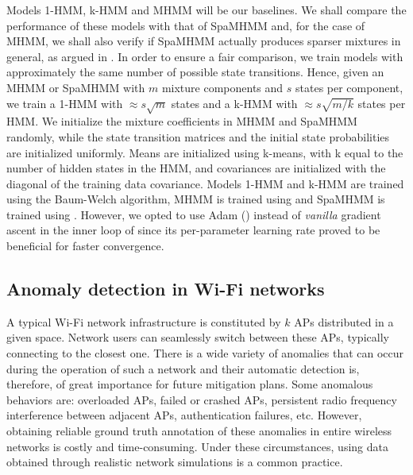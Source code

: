 Models 1-HMM, k-HMM and MHMM will be our baselines. We shall compare the performance of these models with that of SpaMHMM and, for the case of MHMM, we shall also verify if SpaMHMM actually produces sparser mixtures in general, as argued in . In order to ensure a fair comparison, we train models with approximately the same number of possible state transitions. Hence, given an MHMM or SpaMHMM with $m$ mixture components and $s$ states per component, we train a 1-HMM with $\approx s\sqrt{m}$ states and a k-HMM with $\approx s\sqrt{m/k}$ states per HMM. We initialize the mixture coefficients in MHMM and SpaMHMM randomly, while the state transition matrices and the initial state probabilities are initialized uniformly. Means are initialized using k-means, with k equal to the number of hidden states in the HMM, and covariances are initialized with the diagonal of the training data covariance. Models 1-HMM and k-HMM are trained using the Baum-Welch algorithm, MHMM is trained using  and SpaMHMM is trained using . However, we opted to use Adam (\citet{Kingma2014}) instead of \textit{vanilla} gradient ascent in the inner loop of  since its per-parameter learning rate proved to be beneficial for faster convergence.

\subsection{Anomaly detection in Wi-Fi networks}
\label{sec:wi_fi}
A typical Wi-Fi network infrastructure is constituted by $k$ APs distributed in a given space. Network users can seamlessly switch between these APs, typically connecting to the closest one. There is a wide variety of anomalies that can occur during the operation of such a network and their automatic detection is, therefore, of great importance for future mitigation plans. Some anomalous behaviors are: overloaded APs, failed or crashed APs, persistent radio frequency interference between adjacent APs, authentication failures, etc. However, obtaining reliable ground truth annotation of these anomalies in entire wireless networks is costly and time-consuming. Under these circumstances, using data obtained through realistic network simulations is a common practice.

